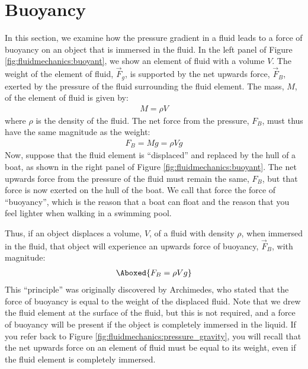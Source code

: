 {{\section{Buoyancy}
In this section, we examine how the pressure gradient in a fluid leads to a force of buoyancy on an object that is immersed in the fluid.
In the left panel of Figure \ref{fig:fluidmechanics:buoyant}, we show an element of fluid with a volume $V$. The weight of the element of fluid, $\vec F_g$, is supported by the net upwards force, $\vec F_B$, exerted by the pressure of the fluid surrounding the fluid element. The mass, $M$, of the element of fluid is given by:
\begin{align*}
M = \rho V
\end{align*} 
where $\rho$ is the density of the fluid. The net force from the pressure, $F_B$, must thus have the same magnitude as the weight:
\begin{align*}
F_B = Mg = \rho V g
\end{align*}
Now, suppose that the fluid element is ``displaced'' and replaced by the hull of a boat, as shown in the right panel of Figure \ref{fig:fluidmechanics:buoyant}. The net upwards force from the pressure of the fluid must remain the same, $F_B$, but that force is now exerted on the hull of the boat. We call that force the force of ``buoyancy'', which is the reason that a boat can float and the reason that you feel lighter when walking in a swimming pool. 

Thus, if an object displaces a volume, $V$, of a fluid with density $\rho$, when immersed in the fluid, that object will experience an upwards force of buoyancy, $\vec F_B$, with magnitude:
\begin{align}
\Aboxed{F_B = \rho V g}
\end{align} 
This ``principle'' was originally discovered by Archimedes, who stated that the force of buoyancy is equal to the weight of the displaced fluid. Note that we drew the fluid element at the surface of the fluid, but this is not required, and a force of buoyancy will be present if the object is completely immersed in the liquid. If you refer back to Figure \ref{fig:fluidmechanics:pressure_gravity}, you will recall that the net upwards force on an element of fluid must be equal to its weight, even if the fluid element is completely immersed.

}}
